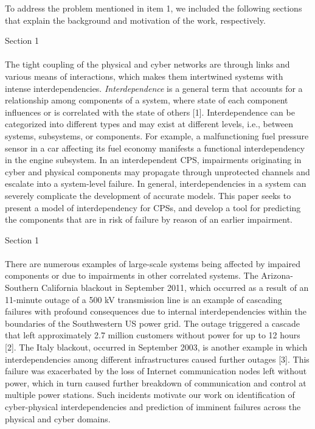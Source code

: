 \documentclass{article}
\newenvironment{response}{
  \doublespacing
  \setlength\parindent{0.05\linewidth}
  \ttfamily
}{}
\newenvironment{textblock}[1]
{\begin{tcolorbox}[breakable,enhanced]{#1 \\ \\}}
{\end{tcolorbox}}
\begin{document}
\begin{response}
To address the problem mentioned in item 1, we included the following sections that explain the background and motivation of the work, respectively.

\begin{textblock}{Section 1}
The tight coupling of the physical and cyber networks are through links and various means of interactions, which makes them intertwined systems with intense interdependencies. \emph{Interdependence} is a general term that accounts for a relationship among components of a system, where state of each component influences or is correlated with the state of others [1]. Interdependence can be categorized into different types and may exist at different levels, i.e., between systems, subsystems, or components. For example, a malfunctioning fuel pressure sensor in a car affecting its fuel economy manifests a functional interdependency in the engine subsystem. In an interdependent CPS, impairments originating in cyber and physical components may propagate through unprotected channels and escalate into a system-level failure. In general, interdependencies in a system can severely complicate the development of accurate models. This paper seeks to present a model of interdependency for CPSs, and develop a tool for predicting the components that are in risk of failure by reason of an earlier impairment.
\end{textblock}

\begin{textblock}{Section 1}
There are numerous examples of large-scale systems being affected by impaired components or due to impairments in other correlated systems. The Arizona-Southern California blackout in September 2011, which occurred as a result of an 11-minute outage of a 500 kV transmission line is an example of cascading failures with profound consequences due to internal interdependencies within the boundaries of the Southwestern US power grid. The outage triggered a cascade that left approximately 2.7 million customers without power for up to 12 hours [2]. The Italy blackout, occurred in September 2003, is another example in which interdependencies among different infrastructures caused further outages [3]. This failure was exacerbated by the loss of Internet communication nodes left without power, which in turn caused further breakdown of communication and control at multiple power stations. Such incidents motivate our work on identification of cyber-physical interdependencies and prediction of imminent failures across the physical and cyber domains.
\end{textblock}


\end{response}
\end{document}

